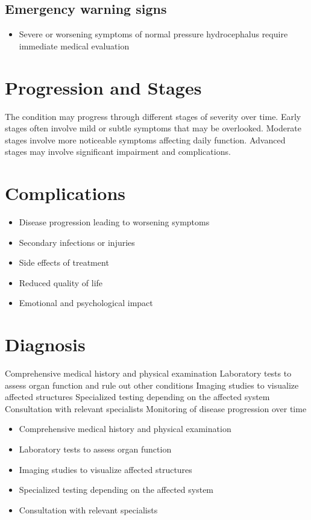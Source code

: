 \subsection{Emergency warning signs}
\begin{itemize}[noitemsep]
  \item Severe or worsening symptoms of normal pressure hydrocephalus require immediate medical evaluation
\end{itemize}
\section{Progression and Stages}
The condition may progress through different stages of severity over time. Early stages often involve mild or subtle symptoms that may be overlooked. Moderate stages involve more noticeable symptoms affecting daily function. Advanced stages may involve significant impairment and complications.
\section{Complications}
\begin{itemize}[noitemsep]
  \item Disease progression leading to worsening symptoms
  \item Secondary infections or injuries
  \item Side effects of treatment
  \item Reduced quality of life
  \item Emotional and psychological impact
\end{itemize}
\section{Diagnosis}
Comprehensive medical history and physical examination Laboratory tests to assess organ function and rule out other conditions Imaging studies to visualize affected structures Specialized testing depending on the affected system Consultation with relevant specialists Monitoring of disease progression over time

\begin{itemize}[noitemsep]
  \item Comprehensive medical history and physical examination
  \item Laboratory tests to assess organ function
  \item Imaging studies to visualize affected structures
  \item Specialized testing depending on the affected system
  \item Consultation with relevant specialists
\end{itemize}
